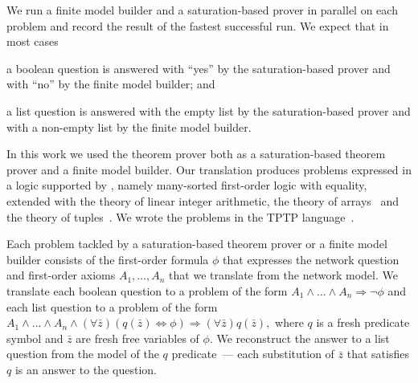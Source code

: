 

We run a finite model builder and a saturation-based prover in parallel on each problem and record the result of the fastest successful run. We expect that in most cases
\begin{enumerate*}[label=(\roman*)]
  \item a boolean question is answered with ``yes'' by the saturation-based prover and with ``no'' by the finite model builder; and
  \item a list question is answered with the empty list by the saturation-based prover and with a non-empty list by the finite model builder.
\end{enumerate*}

In this work we used the \vampire theorem prover both as a saturation-based theorem prover and a finite model builder. Our translation produces problems expressed in a logic supported by \vampire, namely many-sorted first-order logic with equality, extended with the theory of linear integer arithmetic, the theory of arrays~\cite{VampireAndFOOL} and the theory of tuples~\cite{KKV18}. We wrote the problems in the TPTP language~\cite{TPTP}.

Each problem tackled by a saturation-based theorem prover or a finite model builder consists of the first-order formula $\phi$ that expresses the network question and first-order axioms $A_1,\ldots,A_n$ that we translate from the network model. We translate each boolean question to a problem of the form $A_1\wedge\ldots\wedge A_n \Rightarrow \neg\phi$ and each list question to a problem of the form $A_1\wedge\ldots\wedge A_n \wedge (\forall \bar{z})(q(\bar{z})\Leftrightarrow \phi) \Rightarrow (\forall \bar{z})q(\bar{z}),$ where $q$ is a fresh predicate symbol and $\bar{z}$ are fresh free variables of $\phi$. We reconstruct the answer to a list question from the model of the $q$ predicate~--- each substitution of $\bar{z}$ that satisfies $q$ is an answer to the question.

